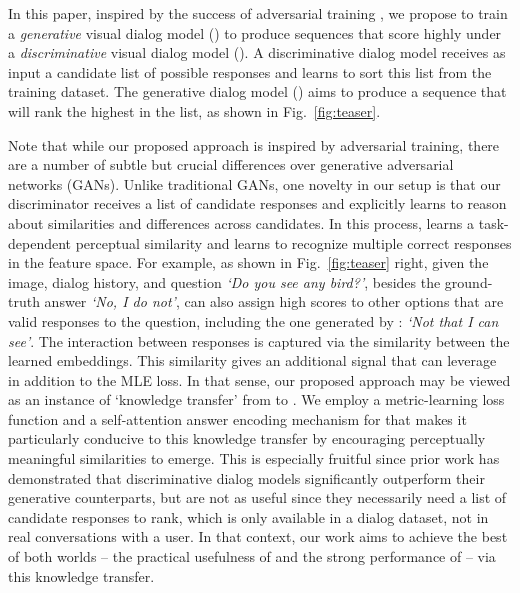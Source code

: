 \documentclass{article}
\newcommand{\myquote}[1]{\emph{`#1'}}
\begin{document}
In this paper, inspired by the success of adversarial training \cite{goodfellow2014generative}, we propose to train a \emph{generative} visual dialog model () to produce sequences that score highly under a \emph{discriminative} visual dialog model (). A discriminative dialog model receives as input a candidate list of possible responses and learns to sort this list from the training dataset. The generative dialog model () aims to produce a sequence that  will rank the highest in the list, as shown in Fig.~\ref{fig:teaser}.

Note that while our proposed approach is inspired by adversarial training, there are a number of subtle but crucial differences over generative adversarial networks (GANs). 
Unlike traditional GANs, one novelty in our setup is that our discriminator receives a list of candidate responses and explicitly learns to 
reason about similarities and differences across candidates.
In this process, 
 learns a task-dependent perceptual similarity \cite{dosovitskiy2016generating, johnson2016perceptual, gatys2015neural} and learns to recognize 
multiple correct responses in the feature space. For example, as shown in  Fig.~\ref{fig:teaser} right, given the image, dialog history, and question 
\myquote{Do you see any bird?}, besides the ground-truth answer \myquote{No, I do not},  can also assign high scores to other options that are 
valid responses to the question, including the one generated by : \myquote{Not that I can see}. 
The interaction between responses is captured via the similarity between the learned embeddings. This similarity gives an additional signal that  can leverage in addition to the MLE loss.
In that sense, our proposed approach may be viewed as an instance of `knowledge transfer' \cite{hinton2015distilling, chen2015net2net} from  to . 
We employ a metric-learning loss function and a self-attention answer encoding mechanism for  that makes 
it particularly conducive to this knowledge transfer 
by encouraging perceptually meaningful similarities to emerge. 
This is especially fruitful since prior work has demonstrated that discriminative dialog models significantly 
outperform their generative counterparts, but are not as useful since they necessarily need a list of candidate responses to rank, 
which is only available in a dialog dataset, not in real conversations with a user. In that context, our work aims to 
achieve the best of both worlds -- the practical usefulness of  and the strong performance of  -- via this knowledge transfer. 
\end{document}
